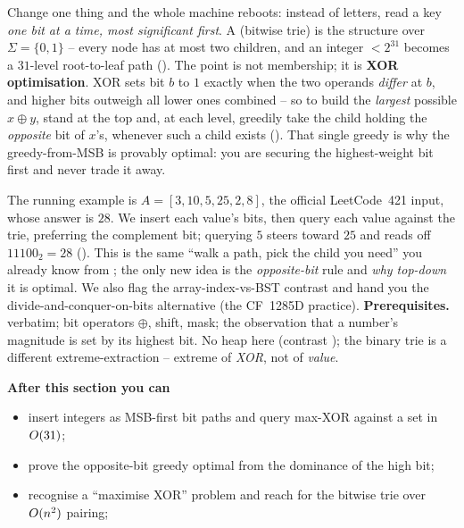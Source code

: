 \begin{topicintro}
Change one thing and the whole machine reboots: instead of letters, read a key \emph{one bit at a time,
most significant first}. A  (bitwise trie) is the  structure over
$\Sigma=\{0,1\}$ -- every node has at most two children, and an integer $<2^{31}$ becomes a $31$-level
root-to-leaf path (). The point is not membership; it is \textbf{XOR optimisation}.
XOR sets bit $b$ to $1$ exactly when the two operands \emph{differ} at $b$, and higher bits outweigh all
lower ones combined -- so to build the \emph{largest} possible $x\oplus y$, stand at the top and, at each
level, greedily take the child holding the \emph{opposite} bit of $x$'s, whenever such a child exists
(). That single greedy is why the greedy-from-MSB is provably optimal: you are
securing the highest-weight bit first and never trade it away.

The running example is $A=[3,10,5,25,2,8]$, the official LeetCode~421 input, whose answer is $28$. We
insert each value's bits, then query each value against the trie, preferring the complement bit; querying
$5$ steers toward $25$ and reads off $11100_2=28$ (). This is the same ``walk a path,
pick the child you need'' you already know from ; the only new idea is the
\emph{opposite-bit} rule and \emph{why top-down} it is optimal. We also flag the array-index-vs-BST
contrast and hand you the divide-and-conquer-on-bits alternative (the CF~1285D practice).
\textbf{Prerequisites.}  verbatim; bit operators $\oplus$, shift, mask; the
observation that a number's magnitude is set by its highest bit. No heap here (contrast ); the
binary trie is a different extreme-extraction -- extreme of \emph{XOR}, not of \emph{value}.

\textbf{After this section you can}
\begin{itemize}[nosep]
  \item insert integers as MSB-first bit paths and query max-XOR against a set in $O(31)$; \hfill{}
  \item prove the opposite-bit greedy optimal from the dominance of the high bit; \hfill{}
  \item recognise a ``maximise XOR'' problem and reach for the bitwise trie over $O(n^2)$ pairing;
        \hfill{}
\end{itemize}
\end{topicintro}

